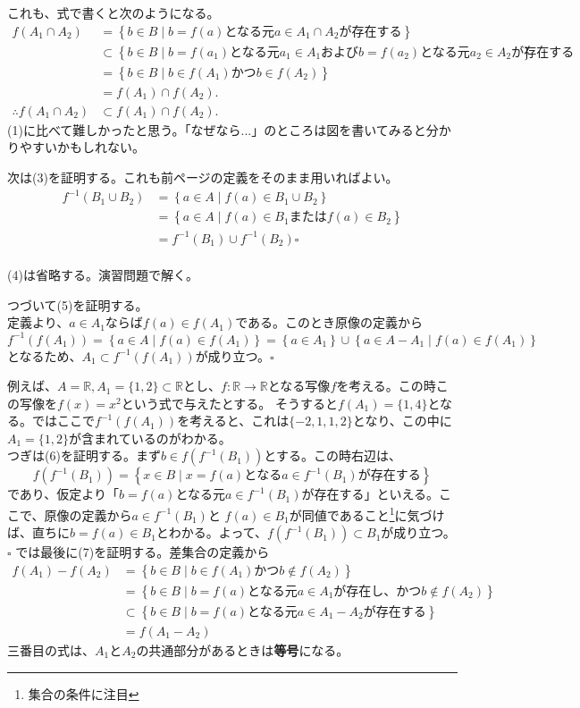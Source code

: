 \documentclass[a4j,dvipdfmx]{jsarticle}
\begin{document}
これも、式で書くと次のようになる。
\begin{align*}
    f(A_1\cap A_2)&=\left\{b\in B\mid \text{$b=f(a)$となる元$a\in A_1 \cap A_2$が存在する}\right\}\\
    &\subset\left\{b\in B\mid \text{$b=f(a_1)$となる元$a_1\in A_1$および$b=f(a_2)$となる元$a_2 \in A_2$が存在する}\right\}\\
    &=\left\{b\in B\mid b\in f(A_1)\text{かつ} b\in f(A_2)\right\}\\
    &=f(A_1)\cap f(A_2).\\
    \therefore f(A_1\cap A_2)&\subset f(A_1)\cap f(A_2).
\end{align*}
(1)に比べて難しかったと思う。「なぜなら...」のところは図を書いてみると分かりやすいかもしれない。

次は(3)を証明する。これも前ページの定義をそのまま用いればよい。
\begin{align*}
    f^{-1}(B_1\cup B_2)
    &=\left\{a\in A\mid f(a)\in B_1\cup B_2\right\}\\
    &=\left\{a\in A\mid f(a)\in B_1 \text{または}f(a)\in B_2\right\}\\
    &=f^{-1}(B_1)\cup f^{-1}(B_2)\square
\end{align*}
\hrulefill\\
(4)は省略する。演習問題で解く。\\
\hrulefill

つづいて(5)を証明する。\\
定義より、$a\in A_1$ならば$f(a)\in f(A_1)$である。このとき原像の定義から$$f^{-1}(f(A_1))=\left\{a\in A\mid f(a)\in f(A_1)\right\}=\left\{a\in A_1\right\}\cup\left\{a\in A-A_1\mid f(a)\in f(A_1)\right\}$$
となるため、$A_1\subset f^{-1}(f(A_1))$が成り立つ。$\square$

例えば、$A=\mathbb{R},A_1=\{1,2\}\subset\mathbb{R}$とし、$f:\mathbb{R}\to\mathbb{R}$となる写像$f$を考える。この時この写像を$f(x)=x^2$という式で与えたとする。
そうすると$f(A_1)=\{1,4\}$となる。ではここで$f^{-1}(f(A_1))$を考えると、これは$\{-2,1,1,2\}$となり、この中に$A_1=\{1,2\}$が含まれているのがわかる。\\

つぎは(6)を証明する。まず$b\in f(f^{-1}(B_1))$とする。この時右辺は、
$$f(f^{-1}(B_1))=\left\{x\in B\mid x=f(a)となるa\in f^{-1}(B_1)が存在する\right\}$$
であり、仮定より「$b=f(a)$となる元$a\in f^{-1}(B_1)$が存在する」といえる。ここで、原像の定義から$a\in f^{-1}(B_1)$と
$f(a)\in B_1$が同値であること\footnote{集合の条件に注目}に気づけば、直ちに$b=f(a)\in B_1$とわかる。よって、$f(f^{-1}(B_1))\subset B_1$が成り立つ。$\square$
\newpage
では最後に(7)を証明する。差集合の定義から
\begin{align*}
    f(A_1)-f(A_2)
    &=\left\{b\in B\mid b\in f(A_1)\text{かつ}b\notin f(A_2)\right\}\\
    &=\left\{b\in B\mid b=f(a)\text{となる元$a\in A_1$が存在し、かつ}b\notin f(A_2)\right\}\\
    &\subset \left\{b\in B\mid b=f(a)\text{となる元$a\in A_1-A_2$が存在する}\right\}\\
    &=f(A_1-A_2)
\end{align*}
三番目の式は、$A_1$と$A_2$の共通部分があるときは\textbf{等号}になる。
\end{document}
